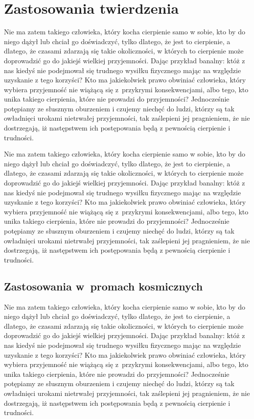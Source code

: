 \documentclass[12pt]{mwbk}
\theoremstyle{plain}
\theoremstyle{definition}
\theoremstyle{remark}
\begin{document}
\section{Zastosowania twierdzenia}
Nie ma zatem takiego człowieka, który kocha cierpienie samo w sobie, 
kto by do niego dążył lub chciał go doświadczyć, tylko dlatego, że
jest to cierpienie, a dlatego, że czasami zdarzają się takie 
okoliczności, w których to cierpienie może doprowadzić 
go do jakiejś wielkiej przyjemności. 
Dając przykład banalny: któż z nas kiedyś nie podejmował 
się trudnego wysiłku fizycznego mając na względzie 
uzyskanie z tego korzyści? 
Kto ma jakiekolwiek prawo obwiniać człowieka, 
który wybiera przyjemność nie wiążącą się z~przykrymi 
konsekwencjami, albo tego, kto unika takiego cierpienia, 
które nie prowadzi do przyjemności? 
Jednocześnie potępiamy ze słusznym oburzeniem i czujemy 
niechęć do ludzi, którzy są tak owładnięci urokami nietrwałej 
przyjemności, tak zaślepieni jej pragnieniem, 
że nie dostrzegają, iż następstwem ich 
postępowania będą z pewnością cierpienie i trudności.




Nie ma zatem takiego człowieka, który kocha cierpienie samo w sobie, 
kto by do niego dążył lub chciał go doświadczyć, tylko dlatego, że
jest to cierpienie, a dlatego, że czasami zdarzają się takie 
okoliczności, w których to cierpienie może doprowadzić 
go do jakiejś wielkiej przyjemności. 
Dając przykład banalny: któż z nas kiedyś nie podejmował 
się trudnego wysiłku fizycznego mając na względzie 
uzyskanie z tego korzyści? 
Kto ma jakiekolwiek prawo obwiniać człowieka, 
który wybiera przyjemność nie wiążącą się z~przykrymi 
konsekwencjami, albo tego, kto unika takiego cierpienia, 
które nie prowadzi do przyjemności? 
Jednocześnie potępiamy ze słusznym oburzeniem i czujemy 
niechęć do ludzi, którzy są tak owładnięci urokami nietrwałej 
przyjemności, tak zaślepieni jej pragnieniem, 
że nie dostrzegają, iż następstwem ich 
postępowania będą z pewnością cierpienie i trudności.
\subsection{Zastosowania w~promach kosmicznych}
Nie ma zatem takiego człowieka, który kocha cierpienie samo w sobie, 
kto by do niego dążył lub chciał go doświadczyć, tylko dlatego, że
jest to cierpienie, a dlatego, że czasami zdarzają się takie 
okoliczności, w których to cierpienie może doprowadzić 
go do jakiejś wielkiej przyjemności. 
Dając przykład banalny: któż z nas kiedyś nie podejmował 
się trudnego wysiłku fizycznego mając na względzie 
uzyskanie z tego korzyści? 
Kto ma jakiekolwiek prawo obwiniać człowieka, 
który wybiera przyjemność nie wiążącą się z~przykrymi 
konsekwencjami, albo tego, kto unika takiego cierpienia, 
które nie prowadzi do przyjemności? 
Jednocześnie potępiamy ze słusznym oburzeniem i czujemy 
niechęć do ludzi, którzy są tak owładnięci urokami nietrwałej 
przyjemności, tak zaślepieni jej pragnieniem, 
że nie dostrzegają, iż następstwem ich 
postępowania będą z pewnością cierpienie i trudności.
\end{document}
